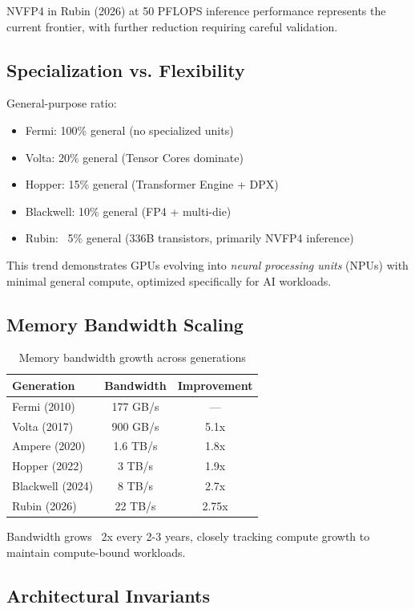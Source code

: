 \documentclass{article}
\begin{document}
NVFP4 in Rubin (2026) at 50 PFLOPS inference performance represents the current frontier, with further reduction requiring careful validation.

\subsection{Specialization vs. Flexibility}

General-purpose ratio:
\begin{itemize}
\item Fermi: 100\% general (no specialized units)
\item Volta: 20\% general (Tensor Cores dominate)
\item Hopper: 15\% general (Transformer Engine + DPX)
\item Blackwell: 10\% general (FP4 + multi-die)
\item Rubin: ~5\% general (336B transistors, primarily NVFP4 inference)
\end{itemize}

This trend demonstrates GPUs evolving into \textit{neural processing units} (NPUs) with minimal general compute, optimized specifically for AI workloads.

\subsection{Memory Bandwidth Scaling}

\begin{table}[h]
\centering
\small
\begin{tabular}{lcc}
\toprule
Generation & Bandwidth & Improvement \\
\midrule
Fermi (2010) & 177 GB/s & — \\
Volta (2017) & 900 GB/s & 5.1x \\
Ampere (2020) & 1.6 TB/s & 1.8x \\
Hopper (2022) & 3 TB/s & 1.9x \\
Blackwell (2024) & 8 TB/s & 2.7x \\
Rubin (2026) & 22 TB/s & 2.75x \\
\bottomrule
\end{tabular}
\caption{Memory bandwidth growth across generations}
\end{table}

Bandwidth grows ~2x every 2-3 years, closely tracking compute growth to maintain compute-bound workloads.

\subsection{Architectural Invariants}
\end{document}
